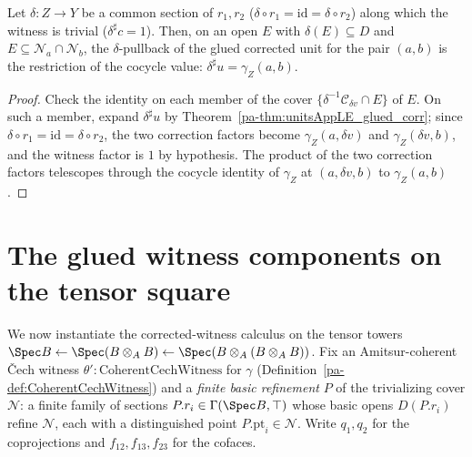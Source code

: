 \begin{theorem}
  \label{pa-thm:glued_corr_collapse}
  \leanok

  Let \(\delta \colon Z \to Y\) be a common section of \(r_1, r_2\) (\(\delta \circ r_1 =
  \mathrm{id} = \delta \circ r_2\)) along which the witness is trivial
  (\(\delta^{\sharp} c = 1\)). Then, on an open \(E\) with \(\delta(E) \subseteq D\) and
  \(E \subseteq \mathcal N_a \cap \mathcal N_b\), the \(\delta\)-pullback of the glued corrected
  unit for the pair \((a, b)\) is the restriction of the cocycle value:
  \(\delta^{\sharp} u = \gamma_Z(a, b)\).
\end{theorem}
\begin{proof}
  \leanok
  Check the identity on each member of the cover \(\{\delta^{-1}\mathcal C_{\delta v} \cap E\}\)
  of \(E\). On such a member, expand \(\delta^{\sharp} u\) by
  Theorem~\ref{pa-thm:unitsAppLE_glued_corr}; since \(\delta \circ r_1 = \mathrm{id} = \delta
  \circ r_2\), the two correction factors become \(\gamma_Z(a, \delta v)\) and
  \(\gamma_Z(\delta v, b)\), and the witness factor is \(1\) by hypothesis. The product of the
  two correction factors telescopes through the cocycle identity of \(\gamma_Z\) at
  \((a, \delta v, b)\) to \(\gamma_Z(a, b)\).
\end{proof}

\section{The glued witness components on the tensor square}
\label{pa-sec:witnessComponents}

We now instantiate the corrected-witness calculus on the tensor towers \(\Spec B \leftarrow
\Spec(B \otimes_A B) \leftarrow \Spec(B \otimes_A (B \otimes_A B))\). Fix an
Amitsur-coherent \v Cech witness \(\theta' \colon \mathrm{CoherentCechWitness}\) for
\(\gamma\) (Definition~\ref{pa-def:CoherentCechWitness}) and a \emph{finite basic refinement}
\(P\) of the trivializing cover \(\mathcal N\): a finite family of sections \(P.r_i \in
\Gamma(\Spec B, \top)\) whose basic opens \(D(P.r_i)\) refine \(\mathcal N\), each with a
distinguished point \(P.\mathrm{pt}_i \in \mathcal N\). Write \(q_1, q_2\) for the
coprojections and \(f_{12}, f_{13}, f_{23}\) for the cofaces.

